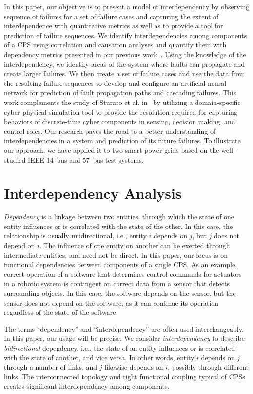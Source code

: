 \documentclass[12pt]{elsarticle}
\begin{document}
In this paper, our objective is to present a model of interdependency by observing sequence of failures for a set of failure cases and capturing the extent of interdependence with quantitative metrics as well as to provide a tool for prediction of failure sequences. We identify interdependencies among components of a CPS using correlation and causation analyses and quantify them with dependency metrics presented in our previous work~\cite{MaS16}. Using the knowledge of the interdependency, we identify areas of the system where faults can propagate and create larger failures. We then create a set of failure cases and use the data from the resulting failure sequences to develop and configure an artificial neural network for prediction of fault propagation paths and cascading failures. This work complements the study of Sturaro et al. in~\cite{StS20} by utilizing a domain-specific cyber-physical simulation tool to provide the resolution required for capturing behaviors of discrete-time cyber components in sensing, decision making, and control roles. Our research paves the road to a better understanding of interdependencies in a system and prediction of its future failures. To illustrate our approach, we have applied it to two smart power grids based on the well-studied IEEE 14--bus and 57--bus test systems.

\section{Interdependency Analysis}
\label{sec:analysis}
\emph{Dependency} is a linkage between two entities, through which the state of one entity influences or is correlated with the state of the other. In this case, the relationship is usually unidirectional, i.e., entity $i$ depends on $j$, but $j$ does not depend on $i$. The influence of one entity on another can be exerted through intermediate entities, and need not be direct. In this paper, our focus is on functional dependencies between components of a single CPS. As an example, correct operation of a software that determines control commands for actuators in a robotic system is contingent on correct data from a sensor that detects surrounding objects. In this case, the software depends on the sensor, but the sensor does not depend on the software, as it can continue its operation regardless of the state of the software.

The terms ``dependency'' and ``interdependency'' are often used interchangeably. In this paper, our usage will be precise. We consider \emph{interdependency} to describe \emph{bidirectional} dependency, i.e., the state of an entity influences or is correlated with the state of another, and vice versa. In other words, entity $i$ depends on $j$ through a number of links, and $j$ likewise depends on $i$, possibly through different links. The interconnected topology and tight functional coupling typical of CPSs creates significant interdependency among components.
\end{document}
